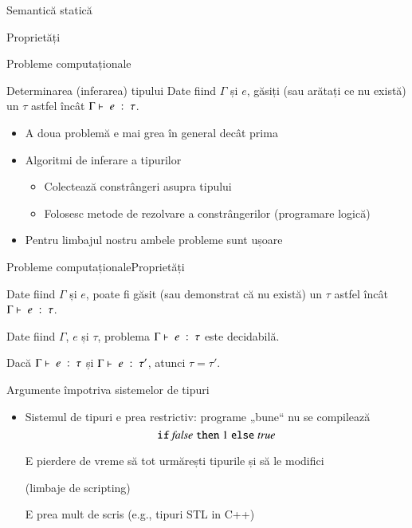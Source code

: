 \begin{section}{Semantică statică}
\begin{subsection}{Proprietăți}
\begin{frame}{Probleme computaționale}
\begin{block}{Determinarea (inferarea) tipului}
Date fiind $\Gamma$ și $e$, găsiți (sau arătați ce nu există) un $\tau$ astfel încât ${\displaystyle \Gamma\vdash \; e \; : \; \tau}$.
\end{block}

\begin{itemize}
\item A doua problemă e mai grea în general decât prima
\item Algoritmi de inferare a tipurilor
\begin{itemize}
\item Colectează constrângeri asupra tipului
\item Folosesc metode de rezolvare a constrângerilor (programare logică)
\end{itemize}
\item Pentru limbajul nostru ambele probleme sunt ușoare
\end{itemize}
\end{frame}

\begin{frame}{Probleme computaționale}{Proprietăți}
\begin{theorem}
Date fiind $\Gamma$ și $e$, poate fi găsit (sau demonstrat că nu există) un $\tau$ astfel încât 
${\displaystyle \Gamma\vdash \; e \; : \; \tau}$.
\end{theorem}
\vfill

\begin{theorem}
Date fiind $\Gamma$, $e$ și $\tau$, problema ${\displaystyle \Gamma\vdash \; e \; : \; \tau}$ este decidabilă.
\end{theorem}

\vfill
\begin{theorem}
Dacă ${\displaystyle \Gamma\vdash \; e \; : \; \tau}$ și ${\displaystyle \Gamma\vdash \; e \; : \; \tau'}$, atunci $\tau=\tau'$.
\end{theorem}
\end{frame}

\begin{frame}{Argumente împotriva sistemelor de tipuri}
\begin{itemize}
  \item<2-> Sistemul de tipuri e prea restrictiv: programe „bune“ nu se compilează
      \[\mathrel{\text{\ttfamily if}} {{\it false}} \mathrel{\text{\ttfamily then}} 1 \mathrel{\text{\ttfamily else}} {{\it true}}\]

   E pierdere de vreme să tot urmărești tipurile și să le modifici
     
     (limbaje de scripting)

   E prea mult de scris (e.g., tipuri STL in C++)
    

\end{itemize}
\end{frame}
\end{subsection}
\end{section}
